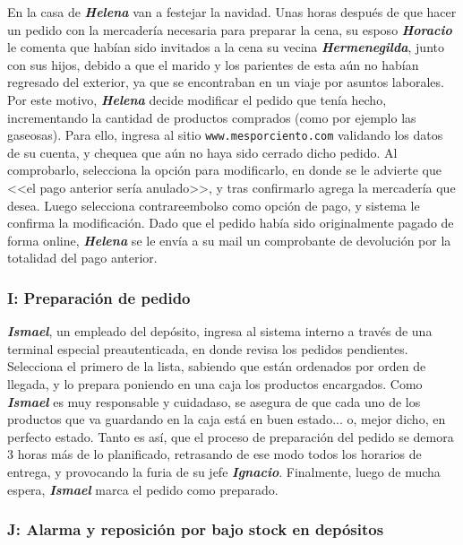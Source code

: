 En la casa de \textbf{\emph{Helena}} van a festejar la navidad. Unas horas
después de que hacer un pedido con la mercadería necesaria para preparar la
cena, su esposo \textbf{\emph{Horacio}} le comenta que habían sido invitados a
la cena su vecina \textbf{\emph{Hermenegilda}}, junto con sus hijos, debido a
que el marido y los parientes de esta aún no habían regresado del exterior, ya
que se encontraban en un viaje por asuntos laborales. Por este motivo,
\textbf{\emph{Helena}} decide modificar el pedido que tenía hecho,
incrementando la cantidad de productos comprados (como por ejemplo las
gaseosas). Para ello, ingresa al sitio \texttt{www.mesporciento.com} validando
los datos de su cuenta, y chequea que aún no haya sido cerrado dicho pedido.
Al comprobarlo, selecciona la opción para modificarlo, en donde se le advierte
que <<el pago anterior sería anulado>>, y tras confirmarlo agrega la
mercadería que desea. Luego selecciona contrareembolso como opción de pago, y
sistema le confirma la modificación. Dado que el pedido había sido
originalmente pagado de forma online, \textbf{\emph{Helena}} se le envía a su
mail un comprobante de devolución por la totalidad del pago anterior.

\subsubsection{I: Preparación de pedido}

\textbf{\emph{Ismael}}, un empleado del depósito, ingresa al sistema interno a
través de una terminal especial preautenticada, en donde revisa los pedidos
pendientes. Selecciona el primero de la lista, sabiendo que están ordenados
por orden de llegada, y lo prepara poniendo en una caja los productos
encargados. Como \textbf{\emph{Ismael}} es muy responsable y cuidadaso, se
asegura de que cada uno de los productos que va guardando en la caja está en
buen estado... o, mejor dicho, en perfecto estado. Tanto es así, que el
proceso de preparación del pedido se demora 3 horas más de lo planificado,
retrasando de ese modo todos los horarios de entrega, y provocando la furia de
su jefe \textbf{\emph{Ignacio}}. Finalmente, luego de mucha espera,
\textbf{\emph{Ismael}} marca el pedido como preparado.

\subsubsection{J: Alarma y reposición por bajo stock en depósitos}

